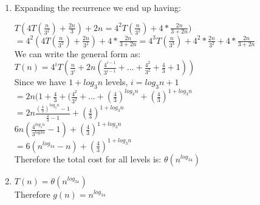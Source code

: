 \documentclass[9pt]{article}
\begin{document}
\begin{enumerate}
\begin{enumerate}
  \item Expanding the recurrence we end up having: 
  
  $T(4T(\frac{n}{3^2}) + \frac{2n}{3}) + 2n = 4^2T(\frac{n}{3^2}) + 4 * \frac{2n}{3 + 2n})$\\
  $= 4^2(4T(\frac{n}{3^3}) + \frac{2n}{3^2}) + 4 *\frac{2n}{3+2n} = 4^3T(\frac{n}{3^3}) + 4^2 *\frac{2n}{3^2} + 4 *\frac{2n}{3 + 2n}$\\
  We can write the general form as: \\
  $T(n)=4^iT(\frac{n}{3^i}+2n(\frac{4^{i-1}}{3^{i-1}}+...+\frac{4^{2}}{3^2}+\frac{4}{3}+1))$\\
  Since we have $1+log_3n$ levels, $i=log_3n+1$\\
  $=2n(1+\frac{4}{3}+(\frac{4^2}{3^2}+...+(\frac{4}{3})^{log_3n}+(\frac{4}{3})^{1+log_3n}$\\
  $=2n \frac{(\frac{4}{3})^{log_3n}-1}{\frac{4}{3}-1}+(\frac{4}{3})^{1+log_3n}$\\
  $6n(\frac{4^{log_3n}}{3^{log3n}}-1)+(\frac{4}{3})^{1+log_3n}$\\
  $=6(n^{log_34}-n)+(\frac{4}{3})^{1+log_3n}$\\
  Therefore the total cost for all levels is: $\theta(n^{log_34})$
  
  
  \item $T(n)=\theta(n^{log_34})$\\
  Therefore $g(n)=n^{log_34}$
  
\end{enumerate}

\fi
\newpage



\vspace{5mm}


\end{enumerate}
\end{document}
